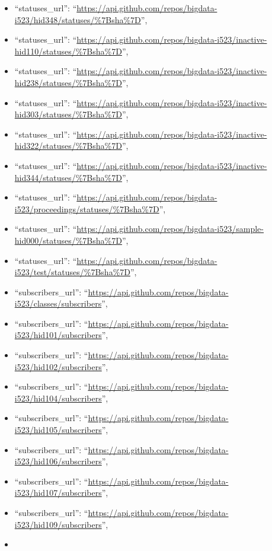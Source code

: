 \begin{itemize}
\item
  ``statuses\_url'':
  ``\url{https://api.github.com/repos/bigdata-i523/hid348/statuses/\%7Bsha\%7D}'',
\item
  ``statuses\_url'':
  ``\url{https://api.github.com/repos/bigdata-i523/inactive-hid110/statuses/\%7Bsha\%7D}'',
\item
  ``statuses\_url'':
  ``\url{https://api.github.com/repos/bigdata-i523/inactive-hid238/statuses/\%7Bsha\%7D}'',
\item
  ``statuses\_url'':
  ``\url{https://api.github.com/repos/bigdata-i523/inactive-hid303/statuses/\%7Bsha\%7D}'',
\item
  ``statuses\_url'':
  ``\url{https://api.github.com/repos/bigdata-i523/inactive-hid322/statuses/\%7Bsha\%7D}'',
\item
  ``statuses\_url'':
  ``\url{https://api.github.com/repos/bigdata-i523/inactive-hid344/statuses/\%7Bsha\%7D}'',
\item
  ``statuses\_url'':
  ``\url{https://api.github.com/repos/bigdata-i523/proceedings/statuses/\%7Bsha\%7D}'',
\item
  ``statuses\_url'':
  ``\url{https://api.github.com/repos/bigdata-i523/sample-hid000/statuses/\%7Bsha\%7D}'',
\item
  ``statuses\_url'':
  ``\url{https://api.github.com/repos/bigdata-i523/test/statuses/\%7Bsha\%7D}'',
\item
  ``subscribers\_url'':
  ``\url{https://api.github.com/repos/bigdata-i523/classes/subscribers}'',
\item
  ``subscribers\_url'':
  ``\url{https://api.github.com/repos/bigdata-i523/hid101/subscribers}'',
\item
  ``subscribers\_url'':
  ``\url{https://api.github.com/repos/bigdata-i523/hid102/subscribers}'',
\item
  ``subscribers\_url'':
  ``\url{https://api.github.com/repos/bigdata-i523/hid104/subscribers}'',
\item
  ``subscribers\_url'':
  ``\url{https://api.github.com/repos/bigdata-i523/hid105/subscribers}'',
\item
  ``subscribers\_url'':
  ``\url{https://api.github.com/repos/bigdata-i523/hid106/subscribers}'',
\item
  ``subscribers\_url'':
  ``\url{https://api.github.com/repos/bigdata-i523/hid107/subscribers}'',
\item
  ``subscribers\_url'':
  ``\url{https://api.github.com/repos/bigdata-i523/hid109/subscribers}'',
\item

\end{itemize}
